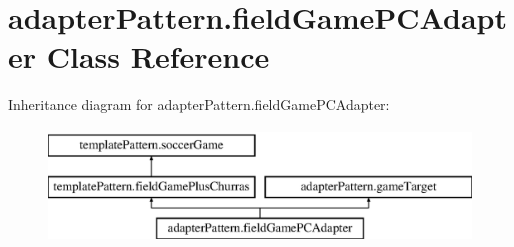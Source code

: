 \hypertarget{classadapter_pattern_1_1field_game_p_c_adapter}{}\section{adapter\+Pattern.\+field\+Game\+P\+C\+Adapter Class Reference}
\label{classadapter_pattern_1_1field_game_p_c_adapter}
Inheritance diagram for adapter\+Pattern.\+field\+Game\+P\+C\+Adapter\+:\begin{figure}[H]
\begin{center}
\leavevmode
\includegraphics[height=3.000000cm]{classadapter_pattern_1_1field_game_p_c_adapter}
\end{center}
\end{figure}
